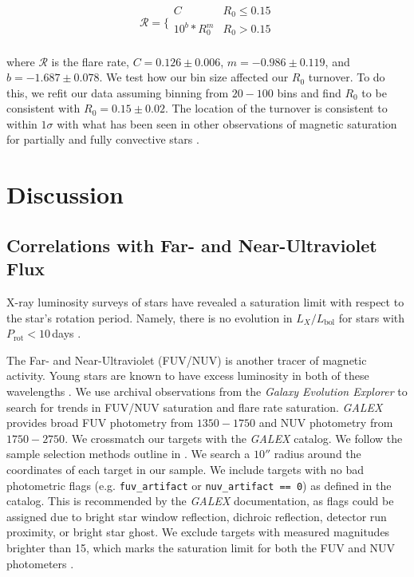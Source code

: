 \documentclass[twocolumn]{aastex631}
\begin{document}
\begin{equation}
  \mathcal{R} =
  \Bigg \{
  \begin{array}{ll}
        C & R_0 \leq 0.15 \\
        10^b * R_0^m  & R_0 > 0.15 \\
  \end{array}
\end{equation}

where $\mathcal{R}$ is the flare rate, $C = 0.126 \pm 0.006$, $m = -0.986 \pm 0.119$, and $b = -1.687 \pm 0.078$.
We test how our bin size affected our $R_0$ turnover. To do this, we refit our data assuming binning from $20 - 100$
bins and find $R_0$ to be consistent with $R_0 = 0.15 \pm 0.02$. The location of the turnover is consistent to
within $1\sigma$ with what has been seen in other observations of magnetic saturation for partially and
fully convective stars \citep[e.g. $L_X/L_\textrm{bol}$; ][]{wright18}.

\section{Discussion}\label{sec:discuss}


\subsection{Correlations with Far- and Near-Ultraviolet Flux}

X-ray luminosity surveys of stars have revealed a saturation limit with respect to
the star's rotation period. Namely, there is no evolution in $L_X/L_\textrm{bol}$ for
stars with $P_\textrm{rot} < 10$\,days \citep{Pizzolato03}.

The Far- and Near-Ultraviolet (FUV/NUV) is another tracer of magnetic activity. Young
stars are known to have excess luminosity in both of these wavelengths \citep{}. We use
archival observations from the \textit{Galaxy Evolution Explorer}
\citep[\textit{GALEX};][]{martin05} to search for trends in FUV/NUV saturation and flare
rate saturation. \textit{GALEX} provides broad FUV photometry from $1350-1750$
and NUV photometry from $1750-2750$. We crossmatch our targets with the \textit{GALEX}
catalog. We follow the sample selection methods outline in \citep{schneider18}. We search
a $10''$ radius around the coordinates of each target in our sample. We include targets with
no bad photometric flags (e.g. \texttt{fuv\_artifact} or \texttt{nuv\_artifact == 0}) as defined
in the catalog. This is recommended by the \textit{GALEX} documentation, as flags could be
assigned due to bright star window reflection, dichroic reflection, detector run proximity,
or bright star ghost. We exclude targets with measured magnitudes brighter than 15, which
marks the saturation limit for both the FUV and NUV photometers \citep{morrissey07}.
\end{document}
